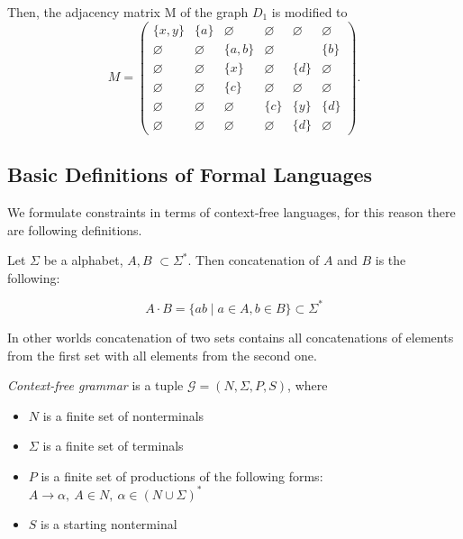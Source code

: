 Then, the adjacency matrix M of the graph $D_1$ is modified to
$$
    M =
    \begin{pmatrix}
    \{x, y\}     & \{a\} &   \varnothing      &   \varnothing   &   \varnothing   &   \varnothing   \\
    \varnothing     &   \varnothing   & \{a, b\} &   \varnothing   &       & \{b\} \\
    \varnothing     &   \varnothing   &   \{x\}      &   \varnothing   & \{d\} &   \varnothing   \\
    \varnothing     &   \varnothing   & \{c\}    &   \varnothing   &   \varnothing   &   \varnothing   \\
    \varnothing     &   \varnothing   &   \varnothing      & \{c\} &   \{y\}   & \{d\} \\
    \varnothing     & \varnothing     &   \varnothing      &   \varnothing   & \{d\} &   \varnothing
    \end{pmatrix}.
$$

\subsection{Basic Definitions of Formal Languages}
We formulate constraints in terms of context-free languages, for this reason there are following definitions.

\begin{definition}
Let $\Sigma$ be a alphabet, $A, B$ $\subset \Sigma^*$. Then concatenation of $A$ and $B$ is the following:

$$A \cdot B = \{a b \mid a \in A, b \in B\} \subset \Sigma^*$$

In other worlds concatenation of two sets contains all concatenations of elements from the first set with all elements from the second one.

\end{definition}

\begin{definition}\emph{Context-free grammar} is a tuple $\mathcal{G}=(N, \Sigma, P, S)$, where 
\begin{itemize}
    \item $N$ is a finite set of nonterminals
    \item $\Sigma$ is a finite set of terminals
    \item $P$ is a finite set of productions of the following forms: $A \to \alpha, ~A \in N,~ \alpha \in (N \cup \Sigma)^*$
    \item $S$ is a starting nonterminal
\end{itemize}
\end{definition}

